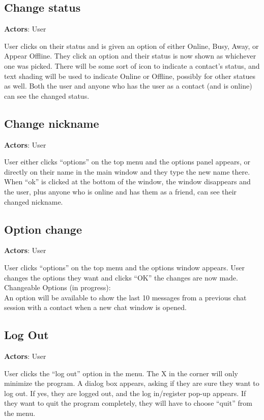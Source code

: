 \subsection{Change status}

{\bf Actors}: User

User clicks on their status and is given an option of either Online, Busy, Away, or Appear Offline. They click an option and their status is now shown as whichever one was picked. There will be some sort of icon to indicate a contact’s status, and text shading will be used to indicate Online or Offline, possibly for other statues as well. Both the user and anyone who has the user as a contact (and is online) can see the changed status.

\subsection{Change nickname}

{\bf Actors}: User

User either clicks ``options'' on the top menu and the options panel appears, or directly on their name in the main window and they type the new name there. When ``ok'' is clicked at the bottom of the window, the window disappears and the user, plus anyone who is online and has them as a friend, can see their changed nickname.

\subsection{Option change}

{\bf Actors}: User

User clicks ``options'' on the top menu and the options window appears. User changes the options they want and clicks ``OK'' the changes are now made. \\
Changeable Options (in progress):\\
An option will be available to show the last 10 messages from a previous chat session with a contact when a new chat window is opened.

\subsection{Log Out}

{\bf Actors}: User

User clicks the ``log out'' option in the menu. The X in the corner will only minimize the program. A dialog box appears, asking if they are sure they want to log out. If yes, they are logged out, and the log in/register pop-up appears. If they want to quit the program completely, they will have to choose ``quit'' from the menu.

